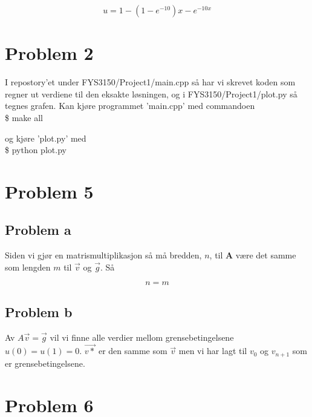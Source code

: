 \documentclass[english,notitlepage]{revtex4-1}  %
\begin{document}
\begin{equation}\label{equ}
u = 1 - (1-e^{-10})x - e^{-10x} 
\end{equation}


\section*{Problem 2}

I repostory'et under FYS3150/Project1/main.cpp så har vi skrevet koden som regner ut verdiene til den eksakte løsningen, og i FYS3150/Project1/plot.py så tegnes grafen. Kan kjøre programmet 'main.cpp' med commandoen \\

\$ make all

og kjøre 'plot.py' med \\

\$ python plot.py

\section*{Problem 5}
\subsection*{Problem a}

Siden vi gjør en matrismultiplikasjon så må bredden, $n$, til $\textbf{A}$ være det samme som lengden $m$ til $\overrightarrow{v}$ og $\overrightarrow{g}$. Så

$$n = m$$

\subsection*{Problem b}
Av $A\vec{v}=\vec{g}$ vil vi finne alle verdier mellom grensebetingelsene $u(0)=u(1)=0$. $\vec{v*}$ er den samme som $\vec{v}$ men vi har lagt til $v_0$ og $v_{n+1}$ som er grensebetingelsene.

\section*{Problem 6}
\end{document}
